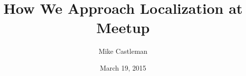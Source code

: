 \documentclass[xetex,aspectratio=169]{beamer}
\title[Localization]{How We Approach Localization at Meetup}
\author{Mike Castleman}
\institute[Meetup]{Meetup, Inc.}
\date[2015-03-19]{March 19, 2015}
\begin{document}
\begin{frame}
\titlepage
\end{frame}
\end{document}

